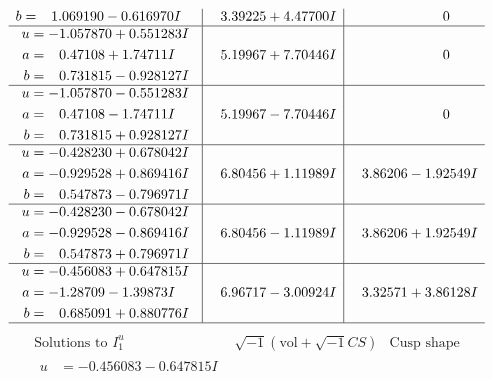 \documentclass[1p]{elsarticle_modified}
\theoremstyle{definition}
\newcommand{\I}{\sqrt{-1}}
\begin{document}
$$\begin{array}{c|c|c}
\begin{aligned}
b &= \phantom{-}1.069190 - 0.616970 I\end{aligned}
 & \phantom{-}3.39225 + 4.47700 I & \phantom{-0.000000 } 0 \\ \hline\begin{aligned}
u &= -1.057870 + 0.551283 I \\
a &= \phantom{-}0.47108 + 1.74711 I \\
b &= \phantom{-}0.731815 - 0.928127 I\end{aligned}
 & \phantom{-}5.19967 + 7.70446 I & \phantom{-0.000000 } 0 \\ \hline\begin{aligned}
u &= -1.057870 - 0.551283 I \\
a &= \phantom{-}0.47108 - 1.74711 I \\
b &= \phantom{-}0.731815 + 0.928127 I\end{aligned}
 & \phantom{-}5.19967 - 7.70446 I & \phantom{-0.000000 } 0 \\ \hline\begin{aligned}
u &= -0.428230 + 0.678042 I \\
a &= -0.929528 + 0.869416 I \\
b &= \phantom{-}0.547873 - 0.796971 I\end{aligned}
 & \phantom{-}6.80456 + 1.11989 I & \phantom{-}3.86206 - 1.92549 I \\ \hline\begin{aligned}
u &= -0.428230 - 0.678042 I \\
a &= -0.929528 - 0.869416 I \\
b &= \phantom{-}0.547873 + 0.796971 I\end{aligned}
 & \phantom{-}6.80456 - 1.11989 I & \phantom{-}3.86206 + 1.92549 I \\ \hline\begin{aligned}
u &= -0.456083 + 0.647815 I \\
a &= -1.28709 - 1.39873 I \\
b &= \phantom{-}0.685091 + 0.880776 I\end{aligned}
 & \phantom{-}6.96717 - 3.00924 I & \phantom{-}3.32571 + 3.86128 I\\
 \hline 
 \end{array}$$\newpage$$\begin{array}{c|c|c}  
\text{Solutions to }I^u_{1}& \I (\text{vol} + \sqrt{-1}CS) & \text{Cusp shape}\\
 \hline 
\begin{aligned}
u &= -0.456083 - 0.647815 I \\

\end{aligned}
\end{array}$$
\end{document}
